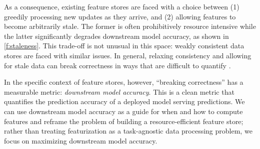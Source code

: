 
As a consequence, existing feature stores are faced with a choice between (1) greedily processing new updates as they arrive, and (2) allowing features to become arbitrarily stale. 
The former is often prohibitively resource intensive while the latter significantly degrades downstream model accuracy, as shown in \cref{f:staleness}. 
This trade-off is not unusual in this space: weakly consistent data stores are faced with similar issues. In general, relaxing consistency and allowing for stale data can break correctness in ways that are difficult to quantify \cite{sivasubramanian2012amazon,cooper2008pnuts}. 

In the specific context of feature stores, however, ``breaking correctness'' has a measurable metric: \emph{downstream model accuracy}. This is a clean %
metric that quantifies the prediction accuracy of a deployed model serving predictions. We can use downstream model accuracy as a guide for when and how to compute features and reframe the problem of building a resource-efficient feature store; rather than treating featurization as a task-agnostic data processing problem, we focus on maximizing downstream model accuracy.

